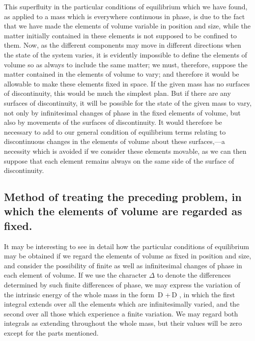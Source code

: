 \documentclass[12pt]{memoir}
\begin{document}
This superfluity in the particular conditions of equilibrium which we have found, as applied to a mass which is everywhere continuous in phase, is due to the fact that we have made the elements of volume variable in position and size, while the matter initially contained in these elements is not supposed to be confined to them. Now, as the different components may move in different directions when the state of the system varies, it is evidently impossible to define the elements of volume so as always to include the same matter; we must, therefore, suppose the matter contained in the elements of volume to vary; and therefore it would be allowable to make these elements fixed in space. If the given mass has no surfaces of discontinuity, this would be much the simplest plan. But if there are any surfaces of discontinuity, it will be possible for the state of the given mass to vary, not only by infinitesimal changes of phase in the fixed elements of volume, but also by movements of the surfaces of discontinuity.  It would therefore be necessary to add to our general condition of equilibrium terms relating to discontinuous changes in the elements of volume about these surfaces,---a necessity which is avoided if we consider these elements movable, as we can then suppose that each element remains always on the same side of the surface of discontinuity.

\subsection{Method of treating the preceding problem, in which the elements of
volume are regarded as fixed.}

It may be interesting to see in detail how the particular conditions of equilibrium may be obtained if we regard the elements of volume as fixed in position and size, and consider the possibility of finite as well as infinitesimal changes of phase in each element of volume. If we use the character $\Delta$ to denote the differences determined by such finite differences of phase, we may express the variation of the intrinsic energy of the whole mass in the form
\eqs \int \delta \,D \epsilon +\int \Delta \,D \epsilon,  \label{237}\eqe
in which the first integral extends over all the elements which are infinitesimally varied, and the second over all those which experience a finite variation. We may regard both integrals as extending throughout the whole mass, but their values will be zero except for the parts mentioned.
\end{document}
